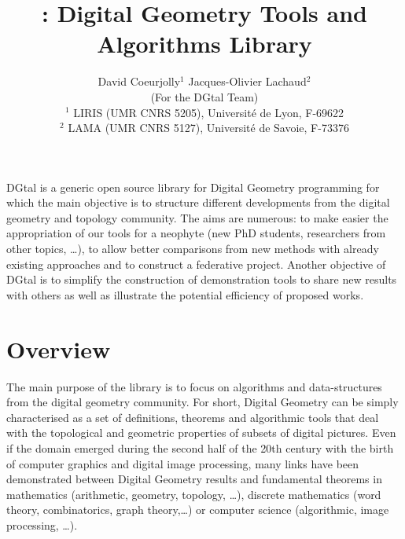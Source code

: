 \documentclass[11pt, a4paper]{article}
\date{}
\title{\DGtal: Digital Geometry Tools and Algorithms Library}
\author{David Coeurjolly$^1$ \qquad \qquad Jacques-Olivier Lachaud$^2$ \\
  (For the DGtal Team)\\
${}^1$ LIRIS (UMR CNRS 5205), Universit\'{e} de Lyon, F-69622 \\
${}^2$ LAMA (UMR CNRS 5127), Universit\'{e} de Savoie, F-73376\\
}
\begin{document}
\maketitle

DGtal is a generic open source library for Digital Geometry
programming for which the main objective is to structure different
developments from the digital geometry and topology community. The
aims are numerous: to make easier the appropriation of our tools for a
neophyte (new PhD students, researchers from other topics, …), to
allow better comparisons from new methods with already existing
approaches and to construct a federative project. Another objective of
DGtal is to simplify the construction of demonstration tools to share
new results with others as well as illustrate the potential efficiency
of proposed works.

\section*{Overview}

The main purpose of the library is to focus on algorithms and
data-structures from the digital geometry community. For short,
Digital Geometry can be simply characterised as a set of definitions,
theorems and algorithmic tools that deal with the topological and
geometric properties of subsets of digital pictures. Even if the
domain emerged during the second half of the 20th century with the
birth of computer graphics and digital image processing, many links
have been demonstrated between Digital Geometry results and
fundamental theorems in mathematics (arithmetic, geometry, topology,
\ldots), discrete mathematics (word theory, combinatorics, graph
theory,\ldots) or computer science (algorithmic, image processing,
\ldots).
\end{document}
